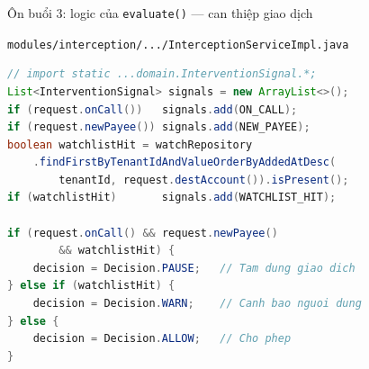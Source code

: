 \documentclass[aspectratio=169,12pt]{beamer}
\begin{document}
\begin{frame}[fragile,shrink=8]{Ôn buổi 3: logic của \texttt{evaluate()} --- can thiệp giao dịch}
  \vspace{-0.35em}
  \begin{block}{\texttt{modules/interception/.../InterceptionServiceImpl.java}}
\begin{lstlisting}[language=java,basicstyle=\ttfamily\footnotesize]
// import static ...domain.InterventionSignal.*;
List<InterventionSignal> signals = new ArrayList<>();
if (request.onCall())   signals.add(ON_CALL);
if (request.newPayee()) signals.add(NEW_PAYEE);
boolean watchlistHit = watchRepository
    .findFirstByTenantIdAndValueOrderByAddedAtDesc(
        tenantId, request.destAccount()).isPresent();
if (watchlistHit)       signals.add(WATCHLIST_HIT);

if (request.onCall() && request.newPayee()
        && watchlistHit) {
    decision = Decision.PAUSE;   // Tam dung giao dich
} else if (watchlistHit) {
    decision = Decision.WARN;    // Canh bao nguoi dung
} else {
    decision = Decision.ALLOW;   // Cho phep
}
\end{lstlisting}
  \end{block}
\end{frame}
\end{document}
